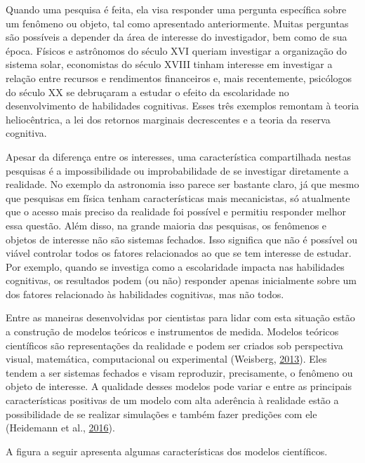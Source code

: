 \documentclass[
]{book}
\begin{document}
Quando uma pesquisa é feita, ela visa responder uma pergunta específica
sobre um fenômeno ou objeto, tal como apresentado anteriormente. Muitas
perguntas são possíveis a depender da área de interesse do investigador,
bem como de sua época. Físicos e astrônomos do século XVI queriam
investigar a organização do sistema solar, economistas do século XVIII
tinham interesse em investigar a relação entre recursos e rendimentos
financeiros e, mais recentemente, psicólogos do século XX se debruçaram
a estudar o efeito da escolaridade no desenvolvimento de habilidades
cognitivas. Esses três exemplos remontam à teoria heliocêntrica, a lei
dos retornos marginais decrescentes e a teoria da reserva cognitiva.

Apesar da diferença entre os interesses, uma característica
compartilhada nestas pesquisas é a impossibilidade ou improbabilidade de
se investigar diretamente a realidade. No exemplo da astronomia isso
parece ser bastante claro, já que mesmo que pesquisas em física tenham
características mais mecanicistas, só atualmente que o acesso mais
preciso da realidade foi possível e permitiu responder melhor essa
questão. Além disso, na grande maioria das pesquisas, os fenômenos e
objetos de interesse não são sistemas fechados. Isso significa que não é
possível ou viável controlar todos os fatores relacionados ao que se tem
interesse de estudar. Por exemplo, quando se investiga como a
escolaridade impacta nas habilidades cognitivas, os resultados podem (ou
não) responder apenas inicialmente sobre um dos fatores relacionado às
habilidades cognitivas, mas não todos.

Entre as maneiras desenvolvidas por cientistas para lidar com esta
situação estão a construção de modelos teóricos e instrumentos de
medida. Modelos teóricos científicos são representações da realidade e
podem ser criados sob perspectiva visual, matemática, computacional ou
experimental (Weisberg, \protect\hyperlink{ref-Weisberg2013}{2013}).
Eles tendem a ser sistemas fechados e visam reproduzir, precisamente, o
fenômeno ou objeto de interesse. A qualidade desses modelos pode variar
e entre as principais características positivas de um modelo com alta
aderência à realidade estão a possibilidade de se realizar simulações e
também fazer predições com ele (Heidemann et al.,
\protect\hyperlink{ref-Heidemann2016}{2016}).

A figura a seguir apresenta algumas características dos modelos
científicos.
\end{document}
